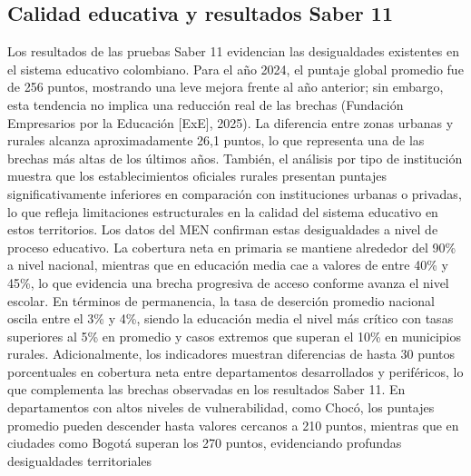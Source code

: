 \subsection{Calidad educativa y resultados Saber 11}
Los resultados de las pruebas Saber 11 evidencian las desigualdades existentes en el sistema educativo colombiano. Para el año 2024, el puntaje global promedio fue de 256 puntos, mostrando una leve mejora frente al año anterior; sin embargo, esta tendencia no implica una reducción real de las brechas (Fundación Empresarios por la Educación [ExE], 2025).
La diferencia entre zonas urbanas y rurales alcanza aproximadamente 26,1 puntos, lo que representa una de las brechas más altas de los últimos años.
También, el análisis por tipo de institución muestra que los establecimientos oficiales rurales presentan puntajes significativamente inferiores en comparación con instituciones urbanas o privadas, lo que refleja limitaciones estructurales en la calidad del sistema educativo en estos territorios.
Los datos del MEN confirman estas desigualdades a nivel de proceso educativo. La cobertura neta en primaria se mantiene alrededor del 90\% a nivel nacional, mientras que en educación media cae a valores de entre 40\% y 45\%, lo que evidencia una brecha progresiva de acceso conforme avanza el nivel escolar. En términos de permanencia, la tasa de deserción promedio nacional oscila entre el 3\% y 4\%, siendo la educación media el nivel más crítico con tasas superiores al 5\% en promedio y casos extremos que superan el 10\% en municipios rurales. Adicionalmente, los indicadores muestran diferencias de hasta 30 puntos porcentuales en cobertura neta entre departamentos desarrollados y periféricos, lo que complementa las brechas observadas en los resultados Saber 11.
En departamentos con altos niveles de vulnerabilidad, como Chocó, los puntajes promedio pueden descender hasta valores cercanos a 210 puntos, mientras que en ciudades como Bogotá superan los 270 puntos, evidenciando profundas desigualdades territoriales
